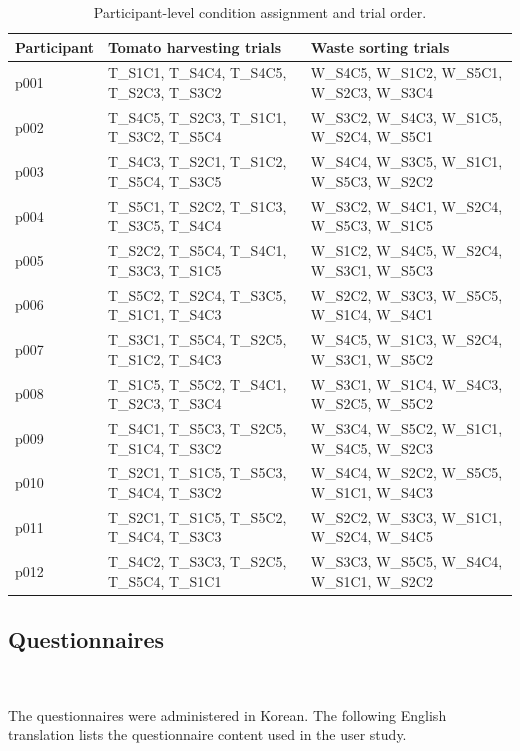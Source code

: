 \begin{table}[t]
\centering
\caption{Participant-level condition assignment and trial order.}
\label{tab:app_participant_condition_order}
\scriptsize
\setlength{\tabcolsep}{3pt}
\begin{tabular*}{\textwidth}{@{\extracolsep{\fill}}lll}
\toprule
\textbf{Participant} & \textbf{Tomato harvesting trials} & \textbf{Waste sorting trials} \\
\midrule
p001 & T\_S1C1, T\_S4C4, T\_S4C5, T\_S2C3, T\_S3C2 & W\_S4C5, W\_S1C2, W\_S5C1, W\_S2C3, W\_S3C4 \\
p002 & T\_S4C5, T\_S2C3, T\_S1C1, T\_S3C2, T\_S5C4 & W\_S3C2, W\_S4C3, W\_S1C5, W\_S2C4, W\_S5C1 \\
p003 & T\_S4C3, T\_S2C1, T\_S1C2, T\_S5C4, T\_S3C5 & W\_S4C4, W\_S3C5, W\_S1C1, W\_S5C3, W\_S2C2 \\
p004 & T\_S5C1, T\_S2C2, T\_S1C3, T\_S3C5, T\_S4C4 & W\_S3C2, W\_S4C1, W\_S2C4, W\_S5C3, W\_S1C5 \\
p005 & T\_S2C2, T\_S5C4, T\_S4C1, T\_S3C3, T\_S1C5 & W\_S1C2, W\_S4C5, W\_S2C4, W\_S3C1, W\_S5C3 \\
p006 & T\_S5C2, T\_S2C4, T\_S3C5, T\_S1C1, T\_S4C3 & W\_S2C2, W\_S3C3, W\_S5C5, W\_S1C4, W\_S4C1 \\
p007 & T\_S3C1, T\_S5C4, T\_S2C5, T\_S1C2, T\_S4C3 & W\_S4C5, W\_S1C3, W\_S2C4, W\_S3C1, W\_S5C2 \\
p008 & T\_S1C5, T\_S5C2, T\_S4C1, T\_S2C3, T\_S3C4 & W\_S3C1, W\_S1C4, W\_S4C3, W\_S2C5, W\_S5C2 \\
p009 & T\_S4C1, T\_S5C3, T\_S2C5, T\_S1C4, T\_S3C2 & W\_S3C4, W\_S5C2, W\_S1C1, W\_S4C5, W\_S2C3 \\
p010 & T\_S2C1, T\_S1C5, T\_S5C3, T\_S4C4, T\_S3C2 & W\_S4C4, W\_S2C2, W\_S5C5, W\_S1C1, W\_S4C3 \\
p011 & T\_S2C1, T\_S1C5, T\_S5C2, T\_S4C4, T\_S3C3 & W\_S2C2, W\_S3C3, W\_S1C1, W\_S2C4, W\_S4C5 \\
p012 & T\_S4C2, T\_S3C3, T\_S2C5, T\_S5C4, T\_S1C1 & W\_S3C3, W\_S5C5, W\_S4C4, W\_S1C1, W\_S2C2 \\
\bottomrule
\end{tabular*}
\end{table}

\subsection{Questionnaires}~\label{appx:user_questionnaires}

The questionnaires were administered in Korean. The following English translation lists the questionnaire content used in the user study.

